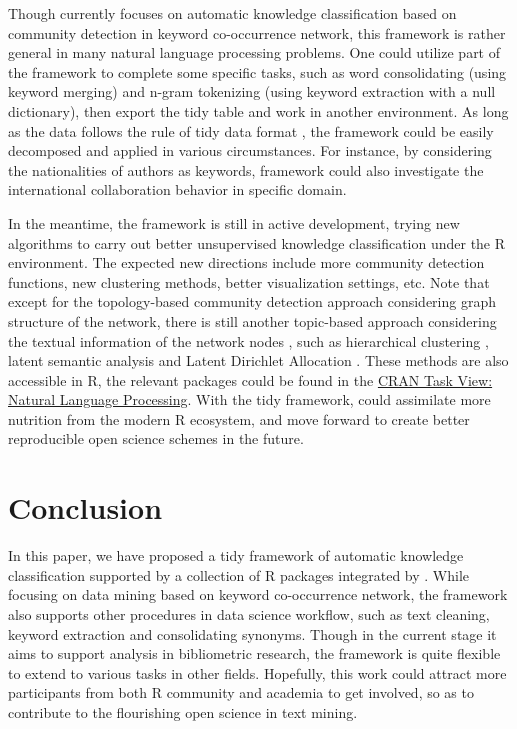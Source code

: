 Though  currently focuses on automatic knowledge
classification based on community detection in keyword co-occurrence
network, this framework is rather general in many natural language
processing problems. One could utilize part of the framework to complete
some specific tasks, such as word consolidating (using keyword merging)
and n-gram tokenizing (using keyword extraction with a null dictionary),
then export the tidy table and work in another environment. As long as
the data follows the rule of tidy data format
\citep{wickham2014tidy, Julia-3165010}, the  framework
could be easily decomposed and applied in various circumstances. For
instance, by considering the nationalities of authors as keywords,
 framework could also investigate the international
collaboration behavior in specific domain.

In the meantime, the  framework is still in active
development, trying new algorithms to carry out better unsupervised
knowledge classification under the R environment. The expected new
directions include more community detection functions, new clustering
methods, better visualization settings, etc. Note that except for the
topology-based community detection approach considering graph structure
of the network, there is still another topic-based approach considering
the textual information of the network nodes \citep{Ding-629}, such as
hierarchical clustering \citep{Newman-633}, latent semantic analysis
\citep{LandauerFoltz-635} and Latent Dirichlet Allocation
\citep{BleiNg-634}. These methods are also accessible in R, the relevant
packages could be found in the
\href{https://cran.r-project.org/web/views/NaturalLanguageProcessing.html}{CRAN
Task View: Natural Language Processing}. With the tidy framework,
 could assimilate more nutrition from the modern R
ecosystem, and move forward to create better reproducible open science
schemes in the future.

\hypertarget{conclusion}{%
\section{Conclusion}\label{conclusion}}

In this paper, we have proposed a tidy framework of automatic knowledge
classification supported by a collection of R packages integrated by
. While focusing on data mining based on keyword
co-occurrence network, the framework also supports other procedures in
data science workflow, such as text cleaning, keyword extraction and
consolidating synonyms. Though in the current stage it aims to support
analysis in bibliometric research, the framework is quite flexible to
extend to various tasks in other fields. Hopefully, this work could
attract more participants from both R community and academia to get
involved, so as to contribute to the flourishing open science in text
mining.

